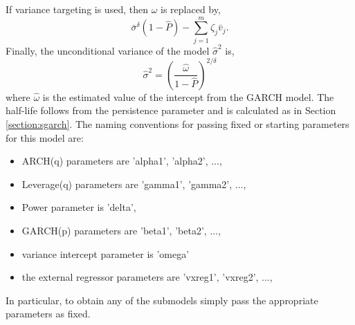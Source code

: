 If variance targeting is used, then $\omega$ is replaced by,
\begin{equation}\label{eq:aparchvt}
{{\bar \sigma }^\delta }\left( {1 - \hat P} \right) - \sum\limits_{j = 1}^m {{\zeta _j}{{\bar v}_j}}.
\end{equation}
Finally, the unconditional variance of the model ${\hat \sigma }^2$ is,
\begin{equation}\label{eq:aparchuncv}
{{\hat \sigma }^2} = {\left( {\frac{{\hat \omega }}{{1 - \hat P}}} \right)^{2/\delta }}
\end{equation}
where $\hat \omega$ is the estimated value of the intercept from the GARCH model.
The half-life follows from the persistence parameter and is calculated as in
Section \ref{section:sgarch}. The naming conventions for passing fixed or
starting parameters for this model are:
\begin{itemize}
\item ARCH(q) parameters are 'alpha1', 'alpha2', ...,
\item Leverage(q) parameters are 'gamma1', 'gamma2', ...,
\item Power parameter is 'delta',
\item GARCH(p) parameters are 'beta1', 'beta2', ...,
\item variance intercept parameter is 'omega'
\item the external regressor parameters are 'vxreg1', 'vxreg2', ...,
\end{itemize}
In particular, to obtain any of the submodels simply pass the appropriate
parameters as fixed.

